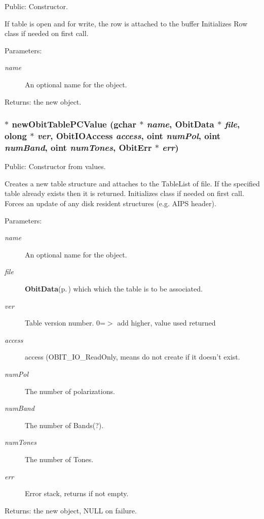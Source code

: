 Public: Constructor. 

If table is open and for write, the row is attached to the buffer Initializes Row class if needed on first call. \begin{Desc}
\item[Parameters:]
\begin{description}
\item[{\em name}]An optional name for the object. \end{description}
\end{Desc}
\begin{Desc}
\item[Returns:]the new object. \end{Desc}
\subsubsection{$\ast$ new\-Obit\-Table\-PCValue (gchar $\ast$ {\em name}, {\bf Obit\-Data} $\ast$ {\em file}, {\bf olong} $\ast$ {\em ver}, Obit\-IOAccess {\em access}, {\bf oint} {\em num\-Pol}, {\bf oint} {\em num\-Band}, {\bf oint} {\em num\-Tones}, {\bf Obit\-Err} $\ast$ {\em err})}\label{ObitTablePC_8h_a12}


Public: Constructor from values. 

Creates a new table structure and attaches to the Table\-List of file. If the specified table already exists then it is returned. Initializes class if needed on first call. Forces an update of any disk resident structures (e.g. AIPS header). \begin{Desc}
\item[Parameters:]
\begin{description}
\item[{\em name}]An optional name for the object. \item[{\em file}]{\bf Obit\-Data}{\rm (p.\,\pageref{structObitData})} which which the table is to be associated. \item[{\em ver}]Table version number. 0=$>$ add higher, value used returned \item[{\em access}]access (OBIT\_\-IO\_\-Read\-Only, means do not create if it doesn't exist. \item[{\em num\-Pol}]The number of polarizations. \item[{\em num\-Band}]The number of Bands(?). \item[{\em num\-Tones}]The number of Tones. \item[{\em err}]Error stack, returns if not empty. \end{description}
\end{Desc}
\begin{Desc}
\item[Returns:]the new object, NULL on failure. \end{Desc}

